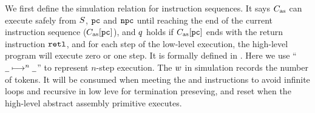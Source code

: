 We first define the simulation relation for
instruction sequences.
It says $C_{\text{as}}$ can execute safely
from $S$, $\texttt{pc}$ and $\texttt{npc}$ until reaching
the end of the current instruction sequence ($C_{\text{as}}[\texttt{pc}]$),
and $q$ holds if $C_{\text{as}}[\texttt{pc}]$ ends with the return
instruction $\texttt{retl}{}$, and for each step of the low-level
execution, the high-level program will execute zero or
one step.
It is formally defined in \Def{\ref{def:siminsseq}}.
Here we use ``$\underline{\ \,} \longmapsto^{n} \underline{\ \,}$'' to
represent $n$-step execution.
The $w$ in simulation records the number of tokens.
It will be consumed when meeting the \jmp{} and \call{}
instructions to avoid infinite loops and recursive in 
low leve for termination preseving, and reset 
when the high-level abstract assembly primitive executes.

